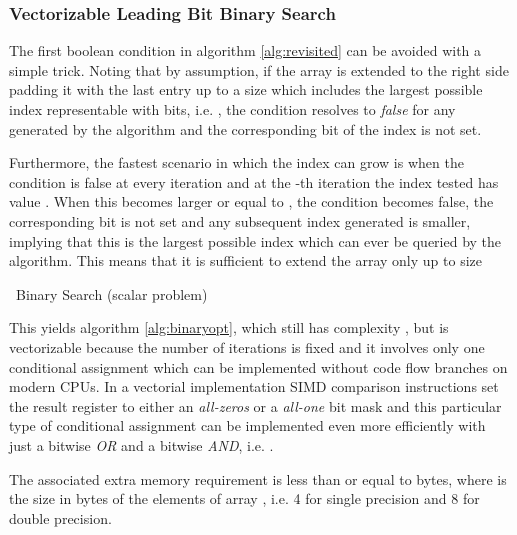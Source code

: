\documentclass[preprint,1p,times]{elsarticle}
\begin{document}
\subsubsection{Vectorizable Leading Bit Binary Search}
\label{sec:leadbit}
The first boolean condition in algorithm \ref{alg:revisited} can be avoided with a simple trick.
Noting that  by assumption, if the array  is extended to the right side padding 
it with the last entry  up to a size which includes the largest possible index representable with  bits, i.e. , the condition  resolves to \textit{false} for any  generated by the algorithm and the corresponding bit of the index is not set.

Furthermore, the fastest scenario in which the index  can grow is when the condition  is false at every iteration and at the -th iteration the index tested has value . When this becomes larger or equal to , the condition  becomes false, the corresponding bit is not set and any subsequent index generated is smaller, implying that this is the largest possible index which can ever be queried by the algorithm. 
This means that it is sufficient to extend the array  only up to size 


\begin{algorithm}[ht]
	\caption{\BitSetName\  Binary Search (scalar problem)}
	\label{alg:binaryopt}
	\begin{algorithmic}
		\Function {\BitSetName}{\fin ,  , , \fout } \Comment{}
		\State 
		\State 
		\Repeat
		\State  {}
		\If {} 
		\State     {}
		\EndIf
		\State  {}
		\Until{  }
		\EndFunction
	\end{algorithmic}
\end{algorithm}

This yields algorithm \ref{alg:binaryopt}, which still has complexity , but is vectorizable because the number of iterations is fixed and it involves only one conditional assignment which can be implemented without code flow branches on modern CPUs. In a vectorial implementation SIMD comparison instructions set the result register to either an \textit{all-zeros} or a \textit{all-one} bit mask and this particular type of conditional assignment can be implemented even more efficiently with just a bitwise \textit{OR} and a bitwise \textit{AND}, i.e. .

The associated extra memory requirement is less than or equal to  bytes, where  is the size in bytes of the elements of array , i.e. 4 for single precision and 8 for double precision.
\end{document}
